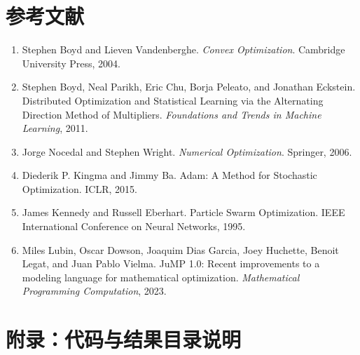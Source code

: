 \documentclass[UTF8,a4paper,12pt,fontset=none]{ctexart}
\begin{document}
\newpage
\section{参考文献}

\begin{enumerate}
\item Stephen Boyd and Lieven Vandenberghe. \textit{Convex Optimization}. Cambridge University Press, 2004.
\item Stephen Boyd, Neal Parikh, Eric Chu, Borja Peleato, and Jonathan Eckstein. Distributed Optimization and Statistical Learning via the Alternating Direction Method of Multipliers. \textit{Foundations and Trends in Machine Learning}, 2011.
\item Jorge Nocedal and Stephen Wright. \textit{Numerical Optimization}. Springer, 2006.
\item Diederik P. Kingma and Jimmy Ba. Adam: A Method for Stochastic Optimization. ICLR, 2015.
\item James Kennedy and Russell Eberhart. Particle Swarm Optimization. IEEE International Conference on Neural Networks, 1995.
\item Miles Lubin, Oscar Dowson, Joaquim Dias Garcia, Joey Huchette, Benoit Legat, and Juan Pablo Vielma. JuMP 1.0: Recent improvements to a modeling language for mathematical optimization. \textit{Mathematical Programming Computation}, 2023.
\end{enumerate}

\newpage
\section{附录：代码与结果目录说明}
\end{document}
